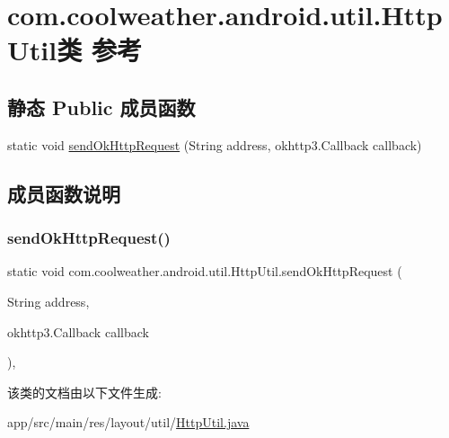 \hypertarget{classcom_1_1coolweather_1_1android_1_1util_1_1_http_util}{}\section{com.\+coolweather.\+android.\+util.\+Http\+Util类 参考}
\label{classcom_1_1coolweather_1_1android_1_1util_1_1_http_util}
\subsection*{静态 Public 成员函数}
\begin{DoxyCompactItemize}
\item 
static void \mbox{\hyperlink{classcom_1_1coolweather_1_1android_1_1util_1_1_http_util_adc5f2dc5e7d8d2c2cf6bdf2820c2fa52}{send\+Ok\+Http\+Request}} (String address, okhttp3.\+Callback callback)
\end{DoxyCompactItemize}


\subsection{成员函数说明}
\mbox{\label{classcom_1_1coolweather_1_1android_1_1util_1_1_http_util_adc5f2dc5e7d8d2c2cf6bdf2820c2fa52}} 
\subsubsection{\texorpdfstring{sendOkHttpRequest()}{sendOkHttpRequest()}}
{\footnotesize\ttfamily static void com.\+coolweather.\+android.\+util.\+Http\+Util.\+send\+Ok\+Http\+Request (\begin{DoxyParamCaption}\item[{String}]{address,  }\item[{okhttp3.\+Callback}]{callback }\end{DoxyParamCaption})\hspace{0.3cm}{\ttfamily [inline]}, {\ttfamily [static]}}



该类的文档由以下文件生成\+:\begin{DoxyCompactItemize}
\item 
app/src/main/res/layout/util/\mbox{\hyperlink{res_2layout_2util_2_http_util_8java}{Http\+Util.\+java}}\end{DoxyCompactItemize}
